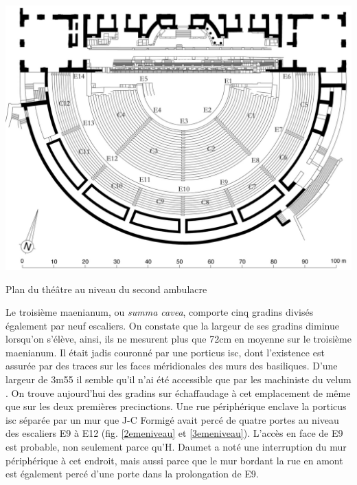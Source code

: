 	\begin{figureth}
		\includegraphics[width=\linewidth]{images/2emeniveau}
		\caption[Vue de dessus - 2ème niveau]{Plan du théâtre au niveau du second \gls{ambulacre} \cite[Pl. XVIII]{orangePl}}
		\label{2emeniveau}
	\end{figureth}		
		
		
Le troisième \gls{maenianum}, ou \textit{summa cavea}, comporte cinq gradins divisés également par neuf escaliers. On constate que la largeur de ses gradins diminue lorsqu'on s'élève, ainsi, ils ne mesurent plus que 72cm en moyenne sur le troisième \gls{maenianum}. Il était jadis couronné par une \gls{porticus isc}, dont l'existence est assurée par des traces sur les faces méridionales des murs des \glspl{basilique}. D'une largeur de 3m55 il semble qu'il n'ai été accessible que par les machiniste du \gls{velum} \cite{formige}. On trouve aujourd'hui des gradins sur échaffaudage à cet emplacement de même que sur les deux premières \glspl{precinction}. Une rue périphérique enclave la \gls{porticus isc} séparée par un mur que J-C Formigé avait percé de quatre portes au niveau des escaliers E9 à E12 (fig. \ref{2emeniveau} et \ref{3emeniveau}). L'accès en face de E9 est probable, non seulement parce qu'H. Daumet a noté une interruption du mur périphérique à cet endroit, mais aussi parce que le mur bordant la rue en amont est également percé d'une porte dans la prolongation de E9.


